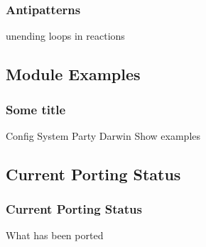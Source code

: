 \documentclass{beamer}
\begin{document}
\begin{frame}
    \frametitle{Antipatterns}
	unending loops in reactions
\end{frame}

\subsection{Module Examples}
\begin{frame}
    \frametitle{Some title}
	Config System
	Party Darwin
	Show examples
\end{frame}

\subsection{Current Porting Status}
\begin{frame}
    \frametitle{Current Porting Status}
	What has been ported
\end{frame}
\end{document}
